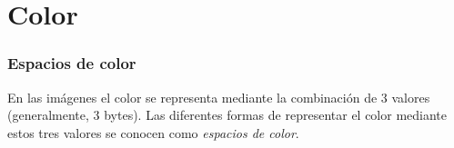 \section{Color}

\begin{frame}\frametitle{Espacios de color}
En las imágenes el color se representa mediante la combinación de 3 valores (generalmente, 3 bytes). Las diferentes formas de representar el color mediante estos tres valores se conocen como \textit{espacios de color}.
\end{frame}
